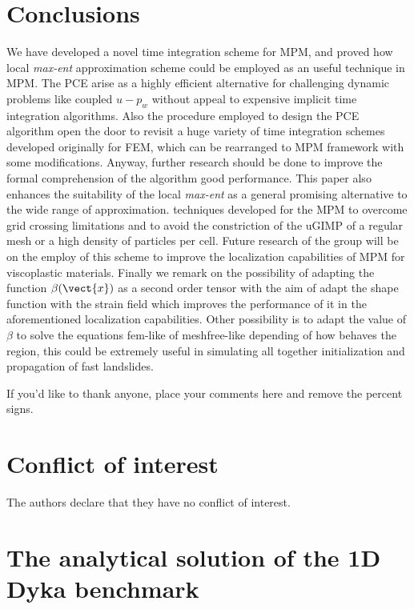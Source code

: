 \section{Conclusions}
\label{sec:conclusions}
We have developed a novel time integration scheme for MPM, and
proved how local \textit{max-ent} approximation scheme could be
employed as an useful technique in MPM. The PCE arise as a highly
efficient alternative for challenging dynamic problems like coupled
$u-p_w$ without appeal to expensive implicit time integration
algorithms. Also the procedure employed to design the PCE algorithm open
the door to revisit a huge variety of time integration schemes
developed originally for FEM, which can be rearranged to MPM framework
with some modifications. Anyway, further research should be done to improve the
formal comprehension of the algorithm good performance. This paper
also enhances the suitability of the local \textit{max-ent} as a
general promising alternative to the wide range of approximation.
techniques developed for the MPM to overcome grid crossing
limitations and to avoid the constriction of the uGIMP of a regular mesh
or a high density of particles per cell. Future research of the
group will be on the employ of this scheme to improve the localization
capabilities of MPM for viscoplastic materials. Finally we remark on
the possibility of adapting the function $\beta(\vect{x})$ as a second
order tensor with the aim of adapt the shape function with the strain field which improves the
performance of it in the aforementioned localization
capabilities. Other possibility is to adapt the value of $\beta$ to
solve the equations fem-like of meshfree-like depending of how behaves
the region, this could be extremely useful in simulating all together
initialization and propagation of fast landslides.

\begin{acknowledgements}
If you'd like to thank anyone, place your comments here
and remove the percent signs.
\end{acknowledgements}

%
\section*{Conflict of interest}
%
The authors declare that they have no conflict of interest.

\appendix

\section{The analytical solution of the 1D Dyka benchmark}
\label{app:analytical_sol}

